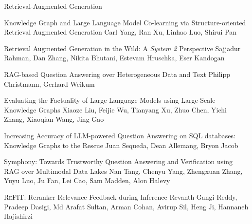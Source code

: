 \documentclass[11pt]{article}
\begin{document}
\begin{bulletin}
\begin{articlesection}{Retrieval-Augmented Generation}
%
%
\begin{article}
{Knowledge Graph and Large Language Model Co-learning via Structure-oriented Retrieval Augmented Generation}
{Carl Yang, Ran Xu, Linhao Luo, Shirui Pan}
\setcounter{section}{0}

\end{article}

\begin{article}
{Retrieval Augmented Generation in the Wild: A \emph{System 2} Perspective}
{Sajjadur Rahman, Dan Zhang, Nikita Bhutani, Estevam Hruschka, Eser Kandogan}
\setcounter{section}{0}

\end{article}

\begin{article}
{RAG-based Question Answering over Heterogeneous Data and Text}
{Philipp Christmann, Gerhard Weikum}
\setcounter{section}{0}

\end{article}

\begin{article}
{Evaluating the Factuality of Large Language Models using Large-Scale Knowledge Graphs}
{Xiaoze Liu, Feijie Wu, Tianyang Xu, Zhuo Chen, Yichi Zhang, Xiaoqian Wang, Jing Gao}
\setcounter{section}{0}

\end{article}

\begin{article}
{Increasing Accuracy of LLM-powered Question Answering on SQL databases: Knowledge Graphs to the Rescue}
{Juan Sequeda, Dean Allemang, Bryon Jacob}
\setcounter{section}{0}

\end{article}

\begin{article}
{Symphony: Towards Trustworthy Question Answering and Verification using RAG over Multimodal Data Lakes}
{Nan Tang, Chenyu Yang, Zhengxuan Zhang, Yuyu Luo, Ju Fan, Lei Cao, Sam Madden, Alon Halevy}
\setcounter{section}{0}

\end{article}

\begin{article}
{\textsc{ReFIT}: Reranker Relevance Feedback during Inference}
{Revanth Gangi Reddy, Pradeep Dasigi, Md Arafat Sultan, Arman Cohan, Avirup Sil, Heng Ji, Hannaneh Hajishirzi}
\setcounter{section}{0}

\end{article}


\end{articlesection}
\end{bulletin}
\end{document}
